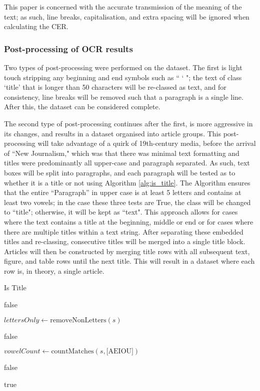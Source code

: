 \documentclass{article} %
\begin{document}
This paper is concerned with the accurate transmission of the meaning of the text; as such, line breaks, capitalisation, and extra spacing will be ignored when calculating the CER. 

\subsubsection{Post-processing of OCR results}

Two types of post-processing were performed on the dataset. The first is light touch stripping any beginning and end symbols such as `` ` "; the text of class `title' that is longer than 50 characters will be re-classed as text, and for consistency, line breaks will be removed such that a paragraph is a single line. After this, the dataset can be considered complete.

The second type of post-processing continues after the first, is more aggressive in its changes, and results in a dataset organised into article groups. This post-processing will take advantage of a quirk of 19th-century media, before the arrival of ``New Journalism," which was that there was minimal text formatting \cite{hampton_new_2008, twycross_rise_2024} and titles were predominantly all upper-case and paragraph separated. As such, text boxes will be split into paragraphs, and each paragraph will be tested as to whether it is a title or not using Algorithm \ref{alg:is_title}. The Algorithm ensures that the entire ``Paragraph'' in upper case is at least 5 letters and contains at least two vowels; in the case these three tests are True, the class will be changed to ``title"; otherwise, it will be kept as ``text". This approach allows for cases where the text contains a title at the beginning, middle or end or for cases where there are multiple titles within a text string.
After separating these embedded titles and re-classing, consecutive titles will be merged into a single title block. Articles will then be constructed by merging title rows with all subsequent text, figure, and table rows until the next title. This will result in a dataset where each row is, in theory, a single article. 

\begin{algorithm}
\caption{Is Title}
\label{alg:is_title}
\begin{algorithmic}[1]

        \State \Return false
    \EndIf
    
    \State $lettersOnly \gets \text{removeNonLetters}(s)$ 
    
        \State \Return false
    \EndIf
    
    \State $vowelCount \gets \text{countMatches}(s, \text{[AEIOU]})$
    
        \State \Return false
    \EndIf
    
    \State \Return true
\EndFunction
\end{algorithmic}
\end{algorithm}
\end{document}
